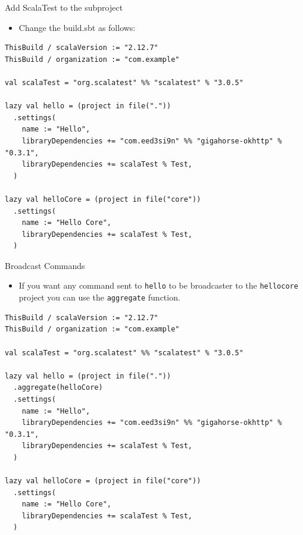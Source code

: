 \documentclass[presentation, aspectratio=169]{beamer}
\begin{document}
\begin{frame}[label={sec:org7c74aa8},fragile]{Add ScalaTest to the subproject}
 \begin{itemize}
\item Change the build.sbt as follows:
\end{itemize}
\tiny
\begin{verbatim}
ThisBuild / scalaVersion := "2.12.7"
ThisBuild / organization := "com.example"

val scalaTest = "org.scalatest" %% "scalatest" % "3.0.5"

lazy val hello = (project in file("."))
  .settings(
    name := "Hello",
    libraryDependencies += "com.eed3si9n" %% "gigahorse-okhttp" % "0.3.1",
    libraryDependencies += scalaTest % Test,
  )

lazy val helloCore = (project in file("core"))
  .settings(
    name := "Hello Core",
    libraryDependencies += scalaTest % Test,
  )
\end{verbatim}
\end{frame}

\begin{frame}[label={sec:org1c41e4e},fragile]{Broadcast Commands}
 \begin{itemize}
\item If you want any command sent to \texttt{hello} to be broadcaster to the \texttt{hellocore} project you can use the 
\texttt{aggregate} function.
\end{itemize}
\tiny
\begin{verbatim}
ThisBuild / scalaVersion := "2.12.7"
ThisBuild / organization := "com.example"

val scalaTest = "org.scalatest" %% "scalatest" % "3.0.5"

lazy val hello = (project in file("."))
  .aggregate(helloCore)
  .settings(
    name := "Hello",
    libraryDependencies += "com.eed3si9n" %% "gigahorse-okhttp" % "0.3.1",
    libraryDependencies += scalaTest % Test,
  )

lazy val helloCore = (project in file("core"))
  .settings(
    name := "Hello Core",
    libraryDependencies += scalaTest % Test,
  )
\end{verbatim}
\end{frame}
\end{document}
